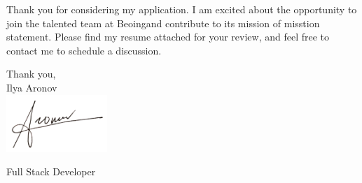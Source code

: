 \documentclass[11pt]{letter}
\def\myname{Ilya Aronov}
\def\mytitle{Full Stack Developer}
\def\companyName{Beoing}
\def\companyMission{misstion statement}
\begin{document}
Thank you for considering my application. I am excited about the opportunity to join the talented team at \companyName and contribute to its mission of \companyMission.
Please find my resume attached for your review, and feel free to contact me to schedule a discussion.


\vspace{0.1in}
\vfill

\begin{flushright}

\vspace{-0.1in}
Thank you, \\
\myname\\

\includegraphics[width=1.5in]{signiture_no_background.png}

\vspace{-0.1in}
\mytitle

\end{flushright}
\end{document}
